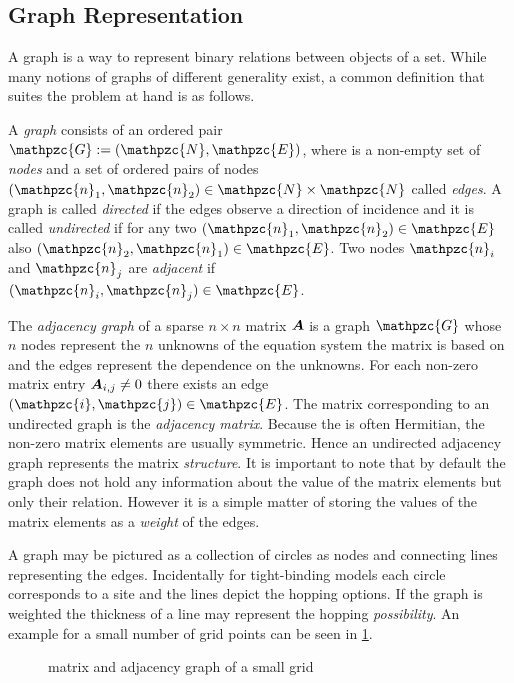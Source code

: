 \subsection{Graph Representation}
A graph is a way to represent binary relations between objects of a set. While many notions of graphs of different generality exist, a common definition that suites the problem at hand is as follows.
\begin{dfn}
A \emph{graph}  consists of an ordered pair $\mathpzc{G} :=(\mathpzc{N},\mathpzc{E})$, where  is a non-empty set of \emph{nodes}  and  a set of ordered pairs of nodes $(\mathpzc{n}_1,\mathpzc{n}_2) \in \mathpzc{N} \times \mathpzc{N}$ called \emph{edges}.
A graph is called \emph{directed} if the edges observe a direction of incidence  and it is called \emph{undirected} if for any two $(\mathpzc{n}_1,\mathpzc{n}_2) \in \mathpzc{E}$ also $(\mathpzc{n}_2,\mathpzc{n}_1) \in \mathpzc{E}$.
Two nodes $\mathpzc{n}_i$ and $\mathpzc{n}_j$ are \emph{adjacent} if $(\mathpzc{n}_i,\mathpzc{n}_j) \in \mathpzc{E}$. \cite{graham1995handbook}
\end{dfn}
The \emph{adjacency graph} of a sparse $n \times n$ matrix $\boldsymbol{A}$ is a graph $\mathpzc{G}$ whose $n$ nodes represent the $n$ unknowns of the equation system the matrix is based on and the edges represent the dependence on the unknowns. For each non-zero matrix entry $\boldsymbol{A}_{i,j}\neq 0$ there exists an edge $(\mathpzc{i},\mathpzc{j}) \in \mathpzc{E}$. The matrix corresponding to an undirected graph is the \emph{adjacency matrix}. Because the \hamil{} is often Hermitian, the non-zero matrix elements are usually symmetric. Hence an undirected adjacency graph represents the matrix \emph{structure}. It is important to note that by default the graph does not hold any information about the value of the matrix elements but only their relation. However it is a simple matter of storing the values of the matrix elements as a \emph{weight} of the edges.\par
A graph may be pictured as a collection of circles as nodes and connecting lines representing the edges. Incidentally for tight-binding models each circle corresponds to a site and the lines depict the hopping options. If the graph is weighted the thickness of a line may represent the hopping \emph{possibility}. An example for a small number of grid points can be seen in \cref{fig:matrixtograph}.
\begin{figure}[!h]
\centering
{} \quad\quad
{} \quad\quad
{}
\caption{\hamil{} matrix and adjacency graph of a small grid}
\label{fig:matrixtograph}
\end{figure}
